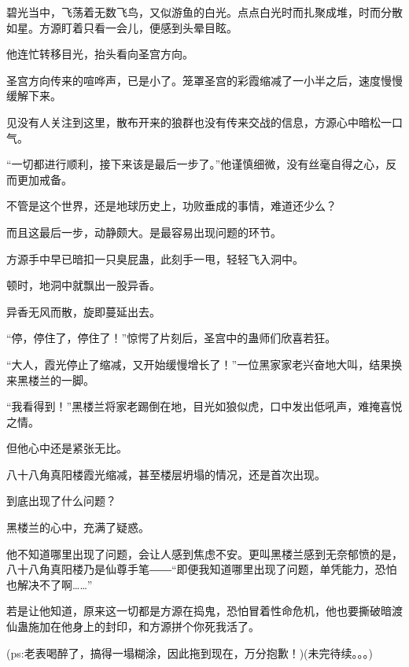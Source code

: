 \begin{this_body}
碧光当中，飞荡着无数飞鸟，又似游鱼的白光。点点白光时而扎聚成堆，时而分散如星。方源盯着只看一会儿，便感到头晕目眩。

他连忙转移目光，抬头看向圣宫方向。

圣宫方向传来的喧哗声，已是小了。笼罩圣宫的彩霞缩减了一小半之后，速度慢慢缓解下来。

见没有人关注到这里，散布开来的狼群也没有传来交战的信息，方源心中暗松一口气。

“一切都进行顺利，接下来该是最后一步了。”他谨慎细微，没有丝毫自得之心，反而更加戒备。

不管是这个世界，还是地球历史上，功败垂成的事情，难道还少么？

而且这最后一步，动静颇大。是最容易出现问题的环节。

方源手中早已暗扣一只臭屁蛊，此刻手一甩，轻轻飞入洞中。

顿时，地洞中就飘出一股异香。

异香无风而散，旋即蔓延出去。

“停，停住了，停住了！”惊愕了片刻后，圣宫中的蛊师们欣喜若狂。

“大人，霞光停止了缩减，又开始缓慢增长了！”一位黑家家老兴奋地大叫，结果换来黑楼兰的一脚。

“我看得到！”黑楼兰将家老踢倒在地，目光如狼似虎，口中发出低吼声，难掩喜悦之情。

但他心中还是紧张无比。

八十八角真阳楼霞光缩减，甚至楼层坍塌的情况，还是首次出现。

到底出现了什么问题？

黑楼兰的心中，充满了疑惑。

他不知道哪里出现了问题，会让人感到焦虑不安。更叫黑楼兰感到无奈郁愤的是，八十八角真阳楼乃是仙尊手笔――“即便我知道哪里出现了问题，单凭能力，恐怕也解决不了啊……”

若是让他知道，原来这一切都是方源在捣鬼，恐怕冒着性命危机，他也要撕破暗渡仙蛊施加在他身上的封印，和方源拼个你死我活了。

(ps:老表喝醉了，搞得一塌糊涂，因此拖到现在，万分抱歉！)(未完待续。。。)

\end{this_body}

